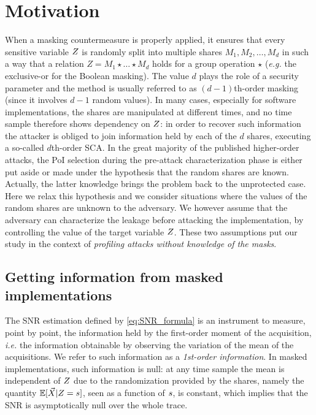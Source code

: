 \section{Motivation}
When a masking countermeasure is properly applied, it ensures that every sensitive variable $Z$  is randomly split  into multiple shares $M_1,M_2,\dots,M_d$ in such a way that a relation $Z = M_1 \star \dots \star M_d$ holds for a group operation $\star$ (\emph{e.g.} the exclusive-or for the Boolean masking). The value $d$ plays the role of a security parameter and the method is usually referred to as $(d-1)$th-order masking (since it involves $d-1$ random values). In many cases, especially for software implementations, the shares are manipulated at different times, and no time sample therefore shows dependency on $Z$: in order to recover such  information the attacker is obliged to join information held by each of the $d$ shares, executing a so-called $d$th-order SCA. In the great majority of the published higher-order attacks, the PoI selection during the pre-attack characterization phase is either put aside or made  under the hypothesis that the random shares are known. Actually, the latter knowledge brings the problem back to the unprotected case. 
Here we relax this hypothesis and we consider  situations where the values of the random shares are unknown to the adversary. We however assume that the adversary can characterize the leakage before attacking the implementation, by controlling the value of the target variable $Z$. These two assumptions put our study in the context of {\em profiling attacks without knowledge of the masks}. \\

\subsection{Getting information from masked implementations}\label{sec:HO}
The SNR estimation defined by \eqref{eq:SNR_formula} is an instrument to measure, point by point, the information held by the first-order moment of the acquisition, \emph{i.e.} the information obtainable by observing the variation of the mean of the acquisitions. We refer to such information as a \emph{1st-order information}. In masked implementations, such information is null: at any time sample the mean is independent of $Z$ due to the randomization provided by the shares, namely the quantity $\mathbb{E}[\vec{X}\vert Z=s]$, seen as a function of $s$, is constant, which implies that the SNR is asymptotically  null over the whole trace.\\
 
